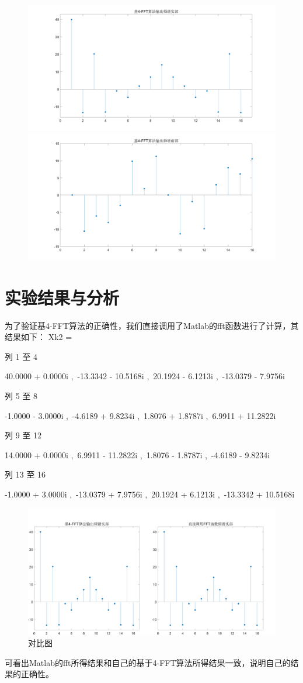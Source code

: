 \documentclass{../source/Experiment}
\begin{document}
        \begin{figure}[H]
            \centering
            \includegraphics[width = 1.0\textwidth]{src/exp3_2.png}
            \includegraphics[width = 1.0\textwidth]{src/exp3_3.png}
        \end{figure}
    \section{实验结果与分析}
    为了验证基4-FFT算法的正确性，我们直接调用了Matlab的fft函数进行了计算，其结果如下：
    Xk2 =

    列 1 至 4

    40.0000 + 0.0000i ,\, -13.3342 - 10.5168i ,\, 20.1924 - 6.1213i ,\, -13.0379 - 7.9756i

    列 5 至 8

    -1.0000 - 3.0000i ,\, -4.6189 + 9.8234i ,\, 1.8076 + 1.8787i ,\, 6.9911 + 11.2822i

    列 9 至 12

    14.0000 + 0.0000i ,\, 6.9911 - 11.2822i ,\, 1.8076 - 1.8787i ,\, -4.6189 - 9.8234i

    列 13 至 16

    -1.0000 + 3.0000i ,\, -13.0379 + 7.9756i ,\, 20.1924 + 6.1213i ,\, -13.3342 + 10.5168i
    \begin{figure}[H]
        \centering
        \includegraphics[width = 1.0\textwidth]{src/exp3_5.png}
        \caption{对比图}
    \end{figure}
    可看出Matlab的fft所得结果和自己的基于4-FFT算法所得结果一致，说明自己的结果的正确性。
\end{document}
